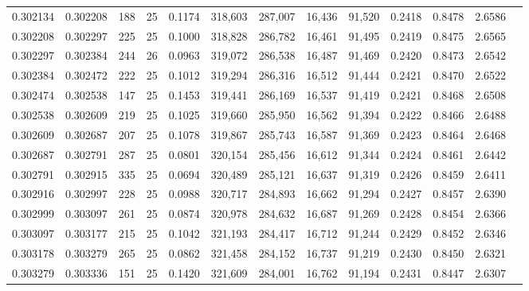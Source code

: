 \begin{tabular}{rrrrrrrrrrrrr}
0.302134 & 0.302208 &   188 &  25 &                                     0.1174 & 318,603 & 287,007 &  16,436 &  91,520 & 0.2418 & 0.8478 & 2.6586 \\
0.302208 & 0.302297 &   225 &  25 &                                     0.1000 & 318,828 & 286,782 &  16,461 &  91,495 & 0.2419 & 0.8475 & 2.6565 \\
0.302297 & 0.302384 &   244 &  26 &                                     0.0963 & 319,072 & 286,538 &  16,487 &  91,469 & 0.2420 & 0.8473 & 2.6542 \\
0.302384 & 0.302472 &   222 &  25 &                                     0.1012 & 319,294 & 286,316 &  16,512 &  91,444 & 0.2421 & 0.8470 & 2.6522 \\
0.302474 & 0.302538 &   147 &  25 &                                     0.1453 & 319,441 & 286,169 &  16,537 &  91,419 & 0.2421 & 0.8468 & 2.6508 \\
0.302538 & 0.302609 &   219 &  25 &                                     0.1025 & 319,660 & 285,950 &  16,562 &  91,394 & 0.2422 & 0.8466 & 2.6488 \\
0.302609 & 0.302687 &   207 &  25 &                                     0.1078 & 319,867 & 285,743 &  16,587 &  91,369 & 0.2423 & 0.8464 & 2.6468 \\
0.302687 & 0.302791 &   287 &  25 &                                     0.0801 & 320,154 & 285,456 &  16,612 &  91,344 & 0.2424 & 0.8461 & 2.6442 \\
0.302791 & 0.302915 &   335 &  25 &                                     0.0694 & 320,489 & 285,121 &  16,637 &  91,319 & 0.2426 & 0.8459 & 2.6411 \\
0.302916 & 0.302997 &   228 &  25 &                                     0.0988 & 320,717 & 284,893 &  16,662 &  91,294 & 0.2427 & 0.8457 & 2.6390 \\
0.302999 & 0.303097 &   261 &  25 &                                     0.0874 & 320,978 & 284,632 &  16,687 &  91,269 & 0.2428 & 0.8454 & 2.6366 \\
0.303097 & 0.303177 &   215 &  25 &                                     0.1042 & 321,193 & 284,417 &  16,712 &  91,244 & 0.2429 & 0.8452 & 2.6346 \\
0.303178 & 0.303279 &   265 &  25 &                                     0.0862 & 321,458 & 284,152 &  16,737 &  91,219 & 0.2430 & 0.8450 & 2.6321 \\
0.303279 & 0.303336 &   151 &  25 &                                     0.1420 & 321,609 & 284,001 &  16,762 &  91,194 & 0.2431 & 0.8447 & 2.6307 \\

\end{tabular}

